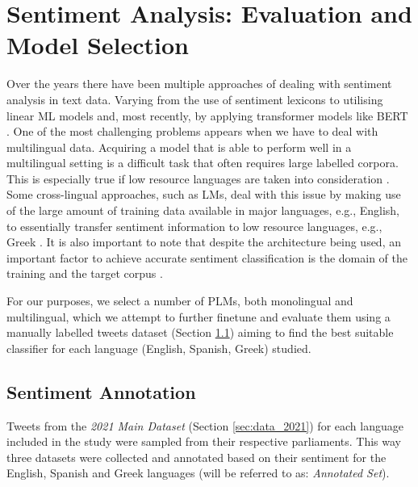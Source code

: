 \section{Sentiment Analysis: Evaluation and Model Selection}\label{sec:models_evaluation}


Over the years there have been multiple approaches of dealing with sentiment analysis in text data. Varying from the use of sentiment lexicons \cite{inui-yamamoto-2011-applying, taboada2011lexicon,banea2008bootstrapping} to utilising linear \ac{ML} models \cite{ahmad2017sentiment} and, most recently, by applying transformer models like BERT \cite{BERT}. One of the most challenging problems appears when we have to deal with multilingual data. Acquiring a model that is able to perform well in a multilingual setting is a difficult task that often requires large labelled corpora. This is especially true if low resource languages are taken into consideration \cite{barnes2018bilingual}. Some cross-lingual approaches, such as \acp{LM}, deal with this issue by making use of the large amount of training data available in major languages, e.g., English, to essentially transfer sentiment information to low resource languages, e.g., Greek \cite{can2018multilingual}. It is also important to note that despite the architecture being used, an important factor to achieve accurate sentiment classification is the domain of the training and the target corpus \cite{peng2018cross}. 

For our purposes, we select a number of \acp{PLM}, both monolingual and multilingual, which we attempt to further finetune and evaluate them using a manually labelled tweets dataset (Section \ref{sec:Politics-annotation}) aiming to find the best suitable classifier for each language (English, Spanish, Greek) studied.

\subsection{Sentiment Annotation}\label{sec:Politics-annotation}
Tweets from the \textit{2021 Main Dataset} (Section \ref{sec:data_2021}) for each language included in the study were sampled from their respective parliaments. This way three datasets were collected and annotated based on their sentiment for the English, Spanish and Greek languages (will be referred to as: \textit{Annotated Set}).

